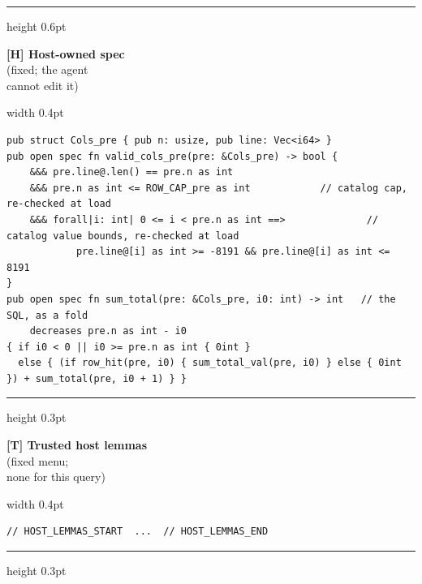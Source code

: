 \noindent\hrule height 0.6pt\vspace{2pt}
\noindent\begin{minipage}[c]{0.2\textwidth}\raggedleft\footnotesize
\textbf{[H] Host-owned spec} \\ {\scriptsize (fixed; the agent \\ cannot edit it)}\end{minipage}\hspace{4pt}\vrule width 0.4pt\hspace{4pt}%
\begin{minipage}[c]{0.74\textwidth}
\begin{lstlisting}[style=lemmacode]
pub struct Cols_pre { pub n: usize, pub line: Vec<i64> }
pub open spec fn valid_cols_pre(pre: &Cols_pre) -> bool {
    &&& pre.line@.len() == pre.n as int
    &&& pre.n as int <= ROW_CAP_pre as int            // catalog cap, re-checked at load
    &&& forall|i: int| 0 <= i < pre.n as int ==>              // catalog value bounds, re-checked at load
            pre.line@[i] as int >= -8191 && pre.line@[i] as int <= 8191
}
pub open spec fn sum_total(pre: &Cols_pre, i0: int) -> int   // the SQL, as a fold
    decreases pre.n as int - i0
{ if i0 < 0 || i0 >= pre.n as int { 0int }
  else { (if row_hit(pre, i0) { sum_total_val(pre, i0) } else { 0int }) + sum_total(pre, i0 + 1) } }
\end{lstlisting}\end{minipage}\par\vspace{2pt}\hrule height 0.3pt\vspace{2pt}
\noindent\begin{minipage}[c]{0.2\textwidth}\raggedleft\footnotesize
\textbf{[T] Trusted host lemmas} \\ {\scriptsize (fixed menu; \\ none for this query)}\end{minipage}\hspace{4pt}\vrule width 0.4pt\hspace{4pt}%
\begin{minipage}[c]{0.74\textwidth}
\begin{lstlisting}[style=lemmacode]
// HOST_LEMMAS_START  ...  // HOST_LEMMAS_END
\end{lstlisting}\end{minipage}\par\vspace{2pt}\hrule height 0.3pt\vspace{2pt}
